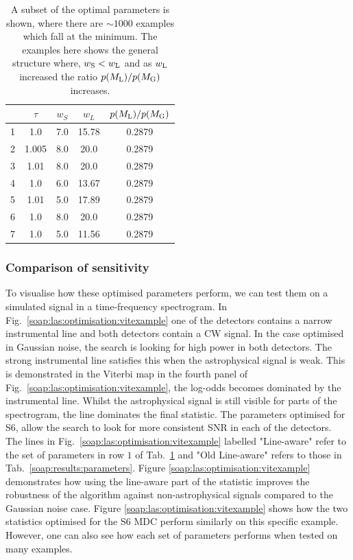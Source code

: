 %
\begin{table}[h]
	\centering
	\caption[Subset of S6 optimal parameters.]{ A subset of the optimal parameters is shown, where there are $\sim 1000$ examples which fall at the minimum. The examples here shows the general structure where, $w_{\rm{S}} < w_{\rm{L}}$ and as $w_{\rm{L}}$ increased the ratio $p(M_{\rm{L}})/p(M_{\rm{G}})$ increases. \label{soap:las:optimisation:opttable} }
	\bgroup
	\def\arraystretch{1.5}
	\centering
	\begin{tabular}{c c c c c}
		\hline
		\hline
		 & $\tau$ & $w_S$ & $w_L$ & $p(M_{\rm{L}})/p(M_{\rm{G}})$ \\
		\hline
		1 & 1.0 & 7.0 & 15.78 & 0.2879\\
		\hline
		2 & 1.005 & 8.0 & 20.0 & 0.2879\\
        \hline
        3 & 1.01 & 8.0 & 20.0 & 0.2879\\
        \hline
        4 & 1.0 & 6.0 & 13.67 & 0.2879\\
        \hline
        5 & 1.01 & 5.0 & 17.89 & 0.2879\\
        \hline
        6 & 1.0 & 8.0 & 20.0 & 0.2879\\
        \hline
        7 & 1.0 & 5.0 & 11.56 & 0.2879\\
        \hline
	\end{tabular}
	\egroup
\end{table}
%

\subsubsection{\label{soap:las:optimisation:comp_sens}Comparison of sensitivity}

To visualise how these optimised parameters perform, we can test them on a simulated signal
in a time-frequency spectrogram. In Fig.~\ref{soap:las:optimisation:vitexample} one of the detectors contains a narrow instrumental line and both detectors contain a \gls{CW} signal.
In the case optimised in Gaussian noise, the search is looking for high power in both
detectors. The strong instrumental line satisfies this when the astrophysical
signal is weak. 
This is demonstrated in the Viterbi map in the fourth panel of Fig.~\ref{soap:las:optimisation:vitexample}, the log-odds becomes dominated by the instrumental line. Whilst the astrophysical signal is still visible for parts of the spectrogram, the line dominates the final statistic.
The parameters optimised for S6, allow the search to look for more consistent \gls{SNR} in each of the detectors. 
The lines in Fig.~\ref{soap:las:optimisation:vitexample} labelled "Line-aware" refer to the set of parameters in row $1$ of Tab.~\ref{soap:las:optimisation:opttable} and "Old Line-aware" refers to those in Tab.~\ref{soap:results:parameters}. 
Figure \ref{soap:las:optimisation:vitexample} demonstrates how using the line-aware part of the statistic improves the robustness of the
algorithm against non-astrophysical signals compared to the Gaussian noise case.
Figure \ref{soap:las:optimisation:vitexample} shows how the two statistics optimised for the S6 \gls{MDC} perform similarly on this specific example.
However, one can also see how each set of parameters performs when tested on many examples. 

